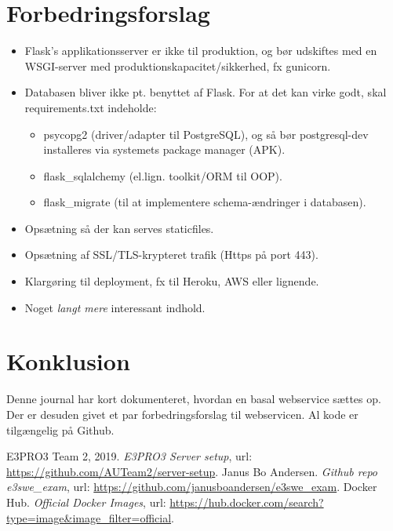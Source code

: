 \documentclass[a4paper]{article}
\begin{document}
\section{Forbedringsforslag}
\begin{itemize}
	\item Flask's applikationsserver er ikke til produktion, og bør udskiftes med en WSGI-server med produktionskapacitet/sikkerhed, fx gunicorn.
	\item Databasen bliver ikke pt. benyttet af Flask. For at det kan virke godt, skal requirements.txt indeholde:
	\begin{itemize}
		\item psycopg2 (driver/adapter til PostgreSQL), og så bør postgresql-dev installeres via systemets package manager (APK).
		\item flask\_sqlalchemy (el.lign. toolkit/ORM til OOP).
		\item flask\_migrate (til at implementere schema-ændringer i databasen).
	\end{itemize}
	\item Opsætning så der kan serves staticfiles.
	\item Opsætning af SSL/TLS-krypteret trafik (Https på port 443).
	\item Klargøring til deployment, fx til Heroku, AWS eller lignende.
	\item Noget \textit{langt mere} interessant indhold.
\end{itemize}

\section{Konklusion}
Denne journal har kort dokumenteret, hvordan en basal webservice sættes op.
Der er desuden givet et par forbedringsforslag til webservicen.
Al kode er tilgængelig på Github.

\begin{thebibliography}{9}
	 E3PRO3 Team 2, 2019. \emph{E3PRO3 Server setup},
	url: \url{https://github.com/AUTeam2/server-setup}.
	 Janus Bo Andersen. \emph{Github repo e3swe\_exam},
	url: \url{https://github.com/janusboandersen/e3swe_exam}.
	 Docker Hub. \emph{Official Docker Images},
	url: \url{https://hub.docker.com/search?type=image&image_filter=official}.
\end{thebibliography}
\end{document}
